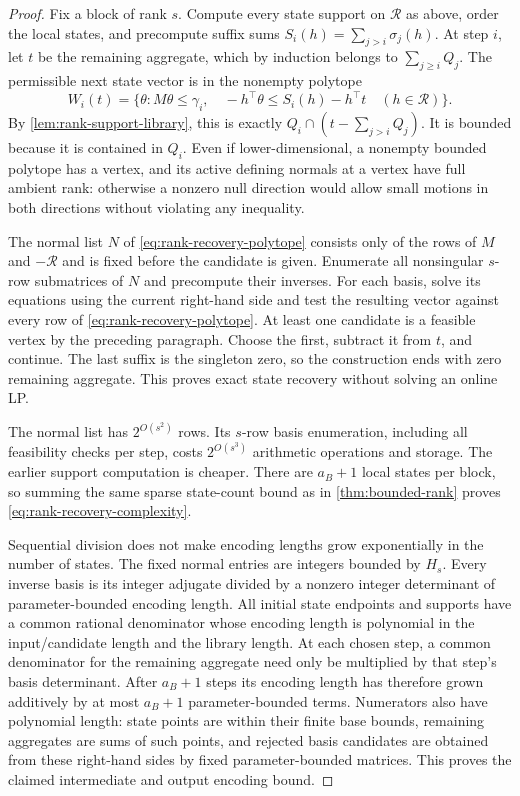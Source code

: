 \begin{proof}
Fix a block of rank $s$. Compute every state support on $\mathcal R$
as above, order the local states, and precompute suffix sums
$S_i(h)=\sum_{j>i}\sigma_j(h)$. At step $i$, let $t$ be the remaining
aggregate, which by induction belongs to $\sum_{j\ge i}Q_j$.
The permissible next state vector is in the nonempty polytope
\begin{equation}\label{eq:rank-recovery-polytope}
 W_i(t)=\{\theta:M\theta\le\gamma_i,\quad
                  -h^\top\theta\le S_i(h)-h^\top t
                                     \quad(h\in\mathcal R)\}.
\end{equation}
By \cref{lem:rank-support-library}, this is exactly
$Q_i\cap(t-\sum_{j>i}Q_j)$. It is bounded because it is contained
in $Q_i$. Even if lower-dimensional, a nonempty bounded polytope has
a vertex, and its active defining normals at a vertex have full ambient
rank: otherwise a nonzero null direction would allow small motions in
both directions without violating any inequality.

The normal list $N$ of \eqref{eq:rank-recovery-polytope} consists only
of the rows of $M$ and $-\mathcal R$ and is fixed before the candidate
is given. Enumerate all nonsingular $s$-row submatrices of $N$ and
precompute their inverses. For each basis, solve its equations using
the current right-hand side and test the resulting vector against every
row of \eqref{eq:rank-recovery-polytope}. At least one candidate is a
feasible vertex by the preceding paragraph. Choose the first, subtract
it from $t$, and continue. The last suffix is the singleton zero, so
the construction ends with zero remaining aggregate. This proves exact
state recovery without solving an online LP.

The normal list has $2^{O(s^2)}$ rows. Its $s$-row basis enumeration,
including all feasibility checks per step, costs $2^{O(s^3)}$ arithmetic
operations and storage. The earlier support computation is cheaper.
There are $a_B+1$ local states per block, so summing the same sparse
state-count bound as in \cref{thm:bounded-rank} proves
\eqref{eq:rank-recovery-complexity}.

Sequential division does not make encoding lengths grow exponentially in
the number of states. The fixed normal entries are
integers bounded by $H_s$. Every inverse basis is its integer adjugate
divided by a nonzero integer determinant of parameter-bounded encoding
length. All initial state endpoints and supports have a common rational
denominator whose encoding length is polynomial in the input/candidate
length and the library length. At each chosen step, a common denominator
for the remaining aggregate need only be multiplied by that step's
basis determinant. After $a_B+1$ steps its encoding length has therefore
grown additively by at most $a_B+1$ parameter-bounded terms. Numerators
also have polynomial length: state points are within their finite base
bounds, remaining aggregates are sums of such points, and rejected
basis candidates are obtained from these right-hand sides by fixed
parameter-bounded matrices. This proves the claimed intermediate and
output encoding bound.


\end{proof}
